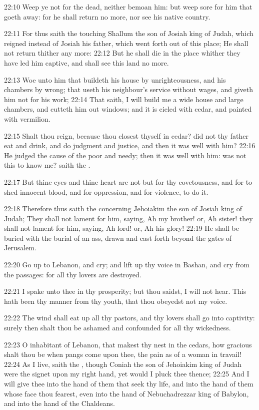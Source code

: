 22:10 Weep ye not for the dead, neither bemoan him: but weep sore for
him that goeth away: for he shall return no more, nor see his native
country.

22:11 For thus saith the \LORD touching Shallum the son of Josiah king
of Judah, which reigned instead of Josiah his father, which went forth
out of this place; He shall not return thither any more: 22:12 But he
shall die in the place whither they have led him captive, and shall
see this land no more.

22:13 Woe unto him that buildeth his house by unrighteousness, and his
chambers by wrong; that useth his neighbour's service without wages,
and giveth him not for his work; 22:14 That saith, I will build me a
wide house and large chambers, and cutteth him out windows; and it is
cieled with cedar, and painted with vermilion.

22:15 Shalt thou reign, because thou closest thyself in cedar? did not
thy father eat and drink, and do judgment and justice, and then it was
well with him?  22:16 He judged the cause of the poor and needy; then
it was well with him: was not this to know me? saith the \LORD.

22:17 But thine eyes and thine heart are not but for thy covetousness,
and for to shed innocent blood, and for oppression, and for violence,
to do it.

22:18 Therefore thus saith the \LORD concerning Jehoiakim the son of
Josiah king of Judah; They shall not lament for him, saying, Ah my
brother! or, Ah sister! they shall not lament for him, saying, Ah
lord! or, Ah his glory!  22:19 He shall be buried with the burial of
an ass, drawn and cast forth beyond the gates of Jerusalem.

22:20 Go up to Lebanon, and cry; and lift up thy voice in Bashan, and
cry from the passages: for all thy lovers are destroyed.

22:21 I spake unto thee in thy prosperity; but thou saidst, I will not
hear. This hath been thy manner from thy youth, that thou obeyedst not
my voice.

22:22 The wind shall eat up all thy pastors, and thy lovers shall go
into captivity: surely then shalt thou be ashamed and confounded for
all thy wickedness.

22:23 O inhabitant of Lebanon, that makest thy nest in the cedars, how
gracious shalt thou be when pangs come upon thee, the pain as of a
woman in travail!  22:24 As I live, saith the \LORD, though Coniah the
son of Jehoiakim king of Judah were the signet upon my right hand, yet
would I pluck thee thence; 22:25 And I will give thee into the hand of
them that seek thy life, and into the hand of them whose face thou
fearest, even into the hand of Nebuchadrezzar king of Babylon, and
into the hand of the Chaldeans.

